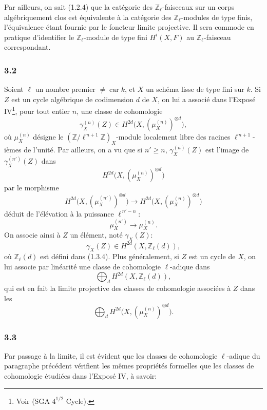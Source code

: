 \documentclass[11pt]{article}
\newcommand{\car}{\operatorname{car}}
\providecommand{\car}{\operatorname{car}}
\providecommand{\car}{\operatorname{car}}
\providecommand{\car}{\operatorname{car}}
\begin{document}
Par ailleurs, on sait (1.2.4) que la catégorie des \(\mathbb Z_\ell\)-faisceaux sur un corps algébriquement clos est équivalente à la catégorie des \(\mathbb Z_\ell\)-modules de type finis, l'équivalence étant fournie par le foncteur limite projective. Il sera commode en pratique d'identifier le \(\mathbb Z_\ell\)-module de type fini \(H^i(X,F)\) au \(\mathbb Z_\ell\)-faisceau correspondant.

\subsubsection*{3.2}
Soient \(\ell\) un nombre premier \(\ne\car k\), et \(X\) un schéma lisse de type fini sur \(k\). Si \(Z\) est un cycle algébrique de codimension \(d\) de \(X\), on lui a associé dans l'Exposé IV\footnote{Voir (SGA \(4^{1/2}\) Cycle).}, pour tout entier \(n\), une classe de cohomologie
\[
\gamma_X^{(n)}(Z)\in H^{2d}\bigl(X,(\mu_X^{(n)})^{\otimes d}\bigr),
\]
où \(\mu_X^{(n)}\) désigne le \((\mathbb Z/\ell^{\,n+1}\mathbb Z)_X\)-module localement libre des racines \(\ell^{\,n+1}\)-ièmes de l'unité. Par ailleurs, on a vu que si \(n'\ge n\), \(\gamma_X^{(n)}(Z)\) est l'image de \(\gamma_X^{(n')}(Z)\) dans
\[
H^{2d}\bigl(X,(\mu_X^{(n)})^{\otimes d}\bigr)
\]
par le morphisme
\[
H^{2d}\bigl(X,(\mu_X^{(n')})^{\otimes d}\bigr)
\longrightarrow
H^{2d}\bigl(X,(\mu_X^{(n)})^{\otimes d}\bigr)
\]
déduit de l'élévation à la puissance \(\ell^{\,n'-n}\):
\[
\mu_X^{(n')}\longrightarrow \mu_X^{(n)}.
\]
On associe ainsi à \(Z\) un élément, noté \(\gamma_X(Z)\):
\[
\gamma_X(Z)\in H^{2d}(X,\mathbb Z_\ell(d)),
\]
où \(\mathbb Z_\ell(d)\) est défini dans (1.3.4). Plus généralement, si \(Z\) est un cycle de \(X\), on lui associe par linéarité une classe de cohomologie \(\ell\)-adique dans
\[
\bigoplus_d H^{2d}(X,\mathbb Z_\ell(d)),
\]
qui est en fait la limite projective des classes de cohomologie associées à \(Z\) dans les
\[
\bigoplus_d H^{2d}\bigl(X,(\mu_X^{(n)})^{\otimes d}\bigr).
\]

\subsubsection*{3.3}
Par passage à la limite, il est évident que les classes de cohomologie \(\ell\)-adique du paragraphe précédent vérifient les mêmes propriétés formelles que les classes de cohomologie étudiées dans l'Exposé IV, à savoir:
\end{document}
